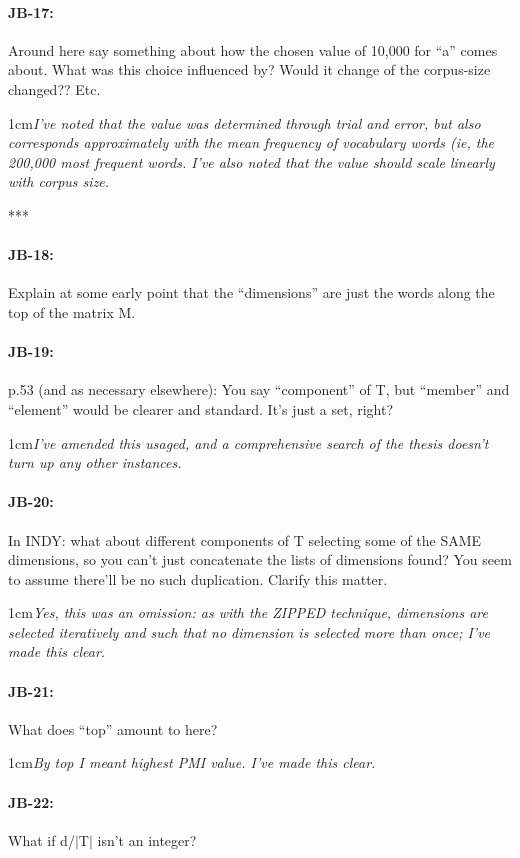\documentclass[11pt,a4paper]{article}
\newcommand{\res}[1]{\vspace{0.25cm} \begin{adjustwidth}{1cm}{}\emph{#1}\end{adjustwidth}}
\begin{document}
\paragraph{JB-17:} Around here say something about how the chosen value of 10,000 for ``a'' comes about. What was this choice influenced by? Would it change of the corpus-size changed?? Etc.

\res{I've noted that the value was determined through trial and error, but also corresponds approximately with the mean frequency of vocabulary words (ie, the 200,000 most frequent words.  I've also noted that the value should scale linearly with corpus size.}

***\paragraph{JB-18:} Explain at some early point that the ``dimensions'' are just the words along the top of the matrix M.

\paragraph{JB-19:} p.53 (and as necessary elsewhere): You say ``component'' of T, but ``member'' and ``element'' would be clearer and standard. It's just a set, right?

\res{I've amended this usaged, and a comprehensive search of the thesis doesn't turn up any other instances.}

\paragraph{JB-20:} In INDY: what about different components of T selecting some of the SAME dimensions, so you can't just concatenate the lists of dimensions found? You seem to assume there'll be no such duplication. Clarify this matter.

\res{Yes, this was an omission: as with the ZIPPED technique, dimensions are selected iteratively and such that no dimension is selected more than once; I've made this clear.}

\paragraph{JB-21:} What does ``top'' amount to here?

\res{By top I meant highest PMI value.  I've made this clear.}

\paragraph{JB-22:} What if d/$|$T$|$ isn't an integer?
\end{document}

